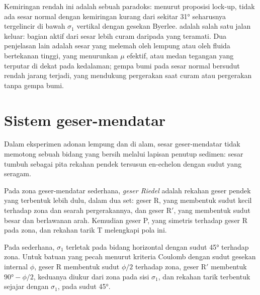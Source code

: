 Kemiringan rendah ini adalah sebuah paradoks: menurut proposisi lock-up, tidak ada sesar normal dengan kemiringan
kurang dari sekitar \ang{31} seharusnya tergelincir di bawah $\sigma_1$ vertikal dengan
gesekan Byerlee.  adalah salah satu jalan keluar: bagian aktif dari
sesar lebih curam daripada yang teramati. Dua penjelasan lain adalah sesar yang melemah oleh lempung
atau oleh fluida bertekanan tinggi, yang menurunkan $\mu$ efektif, atau medan tegangan
yang terputar di dekat  pada kedalaman; gempa bumi pada sesar normal bersudut rendah
jarang terjadi, yang mendukung pergerakan saat curam atau pergerakan tanpa gempa bumi.

\section{Sistem geser-mendatar}\label{sec:b3:extension-strike-slip:strike-slip}

Dalam eksperimen adonan lempung dan di alam, sesar geser-mendatar tidak memotong sebuah
bidang yang bersih melalui lapisan penutup sedimen: sesar tumbuh sebagai pita rekahan pendek
tersusun en-echelon dengan sudut yang seragam.

\begin{definition}\label{def:b3:extension-strike-slip:riedel}
Pada zona geser-mendatar sederhana, \emph{geser Riedel}
adalah rekahan geser pendek yang terbentuk lebih dulu, dalam dua set: geser R, yang
membentuk sudut kecil terhadap zona dan searah pergerakannya, dan geser R$'$, yang
membentuk sudut besar dan berlawanan arah. Kemudian geser P, yang simetris
terhadap geser R pada zona, dan rekahan tarik T melengkapi pola ini.
\end{definition}

\begin{proposition}\label{prop:b3:extension-strike-slip:riedel}
Pada  sederhana, $\sigma_1$ terletak pada bidang horizontal dengan sudut
\ang{45} terhadap zona. Untuk batuan yang pecah menurut kriteria Coulomb dengan
sudut gesekan internal $\phi$, geser R membentuk sudut $\phi/2$ terhadap
zona, geser R$'$ membentuk $\ang{90} - \phi/2$, keduanya diukur dari zona
pada sisi $\sigma_1$, dan rekahan tarik terbentuk sejajar dengan $\sigma_1$,
pada sudut \ang{45}.
\end{proposition}

